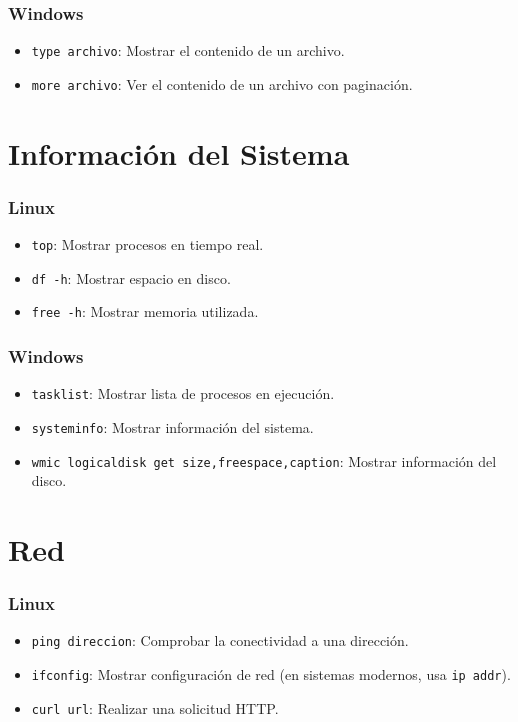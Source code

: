 \subsubsection*{Windows}
\begin{itemize}
    \item \texttt{type archivo}: Mostrar el contenido de un archivo.
    \item \texttt{more archivo}: Ver el contenido de un archivo con paginación.
\end{itemize}

\section*{Información del Sistema}

\subsubsection*{Linux}
\begin{itemize}
    \item \texttt{top}: Mostrar procesos en tiempo real.
    \item \texttt{df -h}: Mostrar espacio en disco.
    \item \texttt{free -h}: Mostrar memoria utilizada.
\end{itemize}

\subsubsection*{Windows}
\begin{itemize}
    \item \texttt{tasklist}: Mostrar lista de procesos en ejecución.
    \item \texttt{systeminfo}: Mostrar información del sistema.
    \item \texttt{wmic logicaldisk get size,freespace,caption}: Mostrar información del disco.
\end{itemize}

\section*{Red}

\subsubsection*{Linux}
\begin{itemize}
    \item \texttt{ping direccion}: Comprobar la conectividad a una dirección.
    \item \texttt{ifconfig}: Mostrar configuración de red (en sistemas modernos, usa \texttt{ip addr}).
    \item \texttt{curl url}: Realizar una solicitud HTTP.
\end{itemize}

